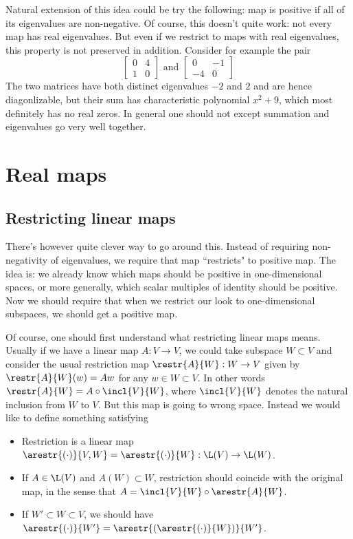 Natural extension of this idea could be try the following: map is positive if all of its eigenvalues are non-negative. Of course, this doesn't quite work: not every map has real eigenvalues. But even if we restrict to maps with real eigenvalues, this property is not preserved in addition. Consider for example the pair
\[
	\begin{bmatrix}
		0 & 4 \\
		1 & 0
	\end{bmatrix}
	\text{ and }
	\begin{bmatrix}
		0 & -1 \\
		-4 & 0
	\end{bmatrix}
\]
The two matrices have both distinct eigenvalues $- 2$ and $2$ and are hence diagonlizable, but their sum has characteristic polynomial $x^2 + 9$, which most definitely has no real zeros. In general one should not except summation and eigenvalues go very well together.

\section{Real maps}

\subsection{Restricting linear maps}

There's however quite clever way to go around this. Instead of requiring non-negativity of eigenvalues, we require that map ``restricts" to positive map. The idea is: we already know which maps should be positive in one-dimensional spaces, or more generally, which scalar multiples of identity should be positive. Now we should require that when we restrict our look to one-dimensional subspaces, we should get a positive map.

Of course, one should first understand what restricting linear maps means. Usually if we have a linear map $A : V \to V$, we could take subspace $W \subset V$ and consider the usual restriction map $\restr{A}{W} : W \to V$ given by $\restr{A}{W}(w) = Aw$ for any $w \in W \subset V$. In other words $\restr{A}{W} = A \circ \incl{V}{W}$, where $\incl{V}{W}$ denotes the natural inclusion from $W$ to $V$. But this map is going to wrong space. Instead we would like to define something satisfying
\begin{itemize}
	\item Restriction is a linear map $\arestr{(\cdot)}{V, W} = \arestr{(\cdot)}{W} : \L(V) \to \L(W)$.
	\item If $A \in \L(V)$ and $A(W) \subset W$, restriction should coincide with the original map, in the sense that $A = \incl{V}{W} \circ \arestr{A}{W}$.
	\item If $W' \subset W \subset V$, we should have $\arestr{(\cdot)}{W'} = \arestr{(\arestr{(\cdot)}{W})}{W'}$.
\end{itemize}

